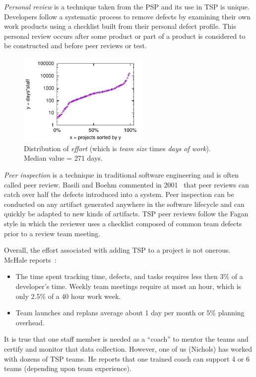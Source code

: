 \documentclass[smallcondesed]{svjour3}
\newcommand{\bi}{\begin{itemize}}%
\newcommand{\ei}{\end{itemize}}
\begin{document}
{\em Personal review} is a technique taken from the PSP and its use in TSP is unique.  Developers follow a systematic process to remove defects by  examining their own work products using a checklist built from their personal defect profile. This personal review occurs after some product or part of a product is considered to be constructed and before peer reviews or test. 

  
 
 
\begin{figure}
\begin{center} 
\includegraphics[width=2.5in]{dom.pdf}
\end{center} 
\caption{Distribution of 
{\em effort} (which is
{\em team size} times
{\em days of work}). Median
value = 271 days.}\label{fig:dist}
\end{figure}

{\em Peer inspection} is a  technique in
traditional software engineering and is often called peer review.
 Basili and Boehm   commented in 2001~\cite{boehm01} 
that peer reviews can catch over half the defects introduced into a system.
Peer inspection can be conducted on any artifact generated anywhere in the software
lifecycle and can quickly be adapted to new kinds of artifacts. TSP peer reviews follow the Fagan style in which the reviewer uses a checklist composed of common team defects prior to a review team meeting. 
 
Overall, the   effort associated with adding TSP to a project is not onerous. McHale reports~\cite{mchale02}:
\bi
\item
 The time spent  tracking time, defects, and tasks requires less then 3\% of a developer's time. Weekly team meetings  require at most an hour, which is
only 2.5\% of a 40 hour work week. 
\item
Team launches and replans average about 1 day per month or 5\% planning overhead.
\ei
It is true that one staff member is needed as a ``coach'' to mentor the teams
and certify and monitor that data collection. However, one of us (Nichols) has worked with dozens of TSP teams. He reports that one  trained coach can support 4 or 6 teams (depending upon team experience).
 
\end{document}
